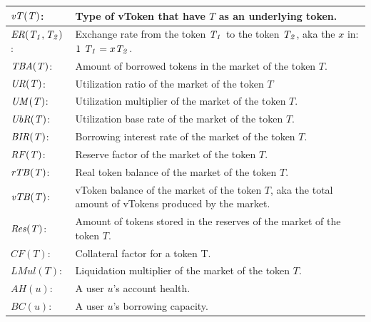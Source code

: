\newcommand\CF[1]{\mathit{CF(#1)}}
\newcommand\LMul[1]{\mathit{LMul(#1)}}
\newcommand\AH[1]{\mathit{AH(#1)}}
\newcommand\BC[1]{\mathit{BC(#1)}}

\newcommand\BI[1]{\mathit{BI(#1)}}
\newcommand\USA[2]{\mathit{USA(#1, #2)}}
\newcommand\UBA[2]{\mathit{USA(#1, #2)}}

\newcommand\TSAV[1]{\mathit{TSAV(#1)}}
\newcommand\TBAV[1]{\mathit{TBAV(#1)}}
\newcommand\uvTA[2]{\mathit{uvTA(#1, #2)}}

\newcommand\IND[2]{\mathit{Ind(#1, #2)}}
\newcommand\INDL[1]{\mathit{Indl(#1)}}
\newcommand\AI[1]{\mathit{AI(#1)}}
\newcommand\SIF[1]{\mathit{SIF(#1)}}

\begin{tabularx}{\linewidth}{|l X|}\hline
  $\mathit{vT(T)}$: & Type of vToken that have $T$ as an underlying token. \\\hline

  $\mathit{ER(\mathit{T_{1}}, \mathit{T_{2}})}$: & Exchange rate from the token $\mathit{T_{1}}$ to the token $\mathit{T_{2}}$, aka the $x$ in: $1\ \mathit{T_{1}} = x \mathit{T_{2}}$. \\\hline

  $\mathit{TBA(T)}$: & Amount of borrowed tokens in the market of the token $T$. \\\hline

  $\mathit{UR(T)}$: & Utilization ratio of the market of the token $T$ \\\hline
  $\mathit{UM(T)}$: & Utilization multiplier of the market of the token $T$. \\\hline
  $\mathit{UbR(T)}$: & Utilization base rate of the market of the token $T$. \\\hline
  $\mathit{BIR(T)}$: & Borrowing interest rate of the market of the token $T$. \\\hline
  $\mathit{RF(T)}$: & Reserve factor of the market of the token $T$. \\\hline

  $\mathit{rTB(T)}$: & Real token balance of the market of the token $T$. \\\hline
  $\mathit{vTB(T)}$: & vToken balance of the market of the token $T$, aka the total amount of vTokens produced by the market. \\\hline
  $\mathit{Res(T)}$: & Amount of tokens stored in the reserves of the market of the token $T$. \\\hline

  $\CF{T}$: & Collateral factor for a token T. \\\hline
  $\LMul{T}$: & Liquidation multiplier of the market of the token $T$. \\\hline
  $\AH{u}$: & A user $u$'s account health. \\\hline
  $\BC{u}$: & A user $u$'s borrowing capacity. \\\hline
  

\end{tabularx}
